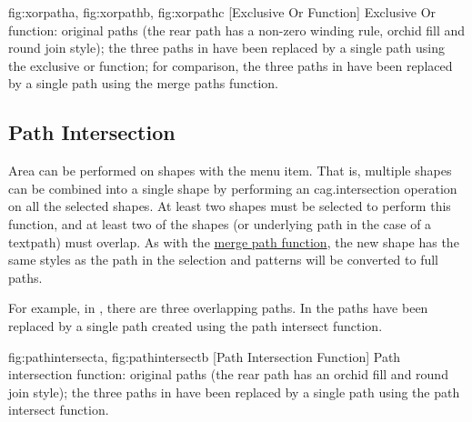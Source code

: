 {
 {fig:xorpatha}{}{},
 {fig:xorpathb}{}{},
 {fig:xorpathc}{}{}
}
[Exclusive Or Function]
{Exclusive Or function: 
 original paths (the rear path has 
a non-zero winding rule, orchid
fill  and round join style);
 the three paths in
 have been replaced by 
a single path using the exclusive or function; 
 for comparison, the three paths in
 have been replaced by 
a single path using the merge paths function.}


\subsection{Path Intersection}\label{sec:pathintersect}


Area  can be performed on \glspl{shape} with
the  menu item. That is, multiple \glspl{shape}
can be combined into a single \gls*{shape} by performing an
\gls{cag.intersection} operation on all the selected \glspl*{shape}.  At
least two \glspl*{shape} must be selected to perform this function, 
and at least two of the shapes (or underlying path
in the case of a \gls{textpath}) must overlap.
As with the \hyperref[sec:mergepaths]{merge path function}, the new
\gls*{shape} has the same styles as the 
path in the selection and \glspl{pattern} will be converted to full
\glspl{path}.

For example, in ,
there are three overlapping paths.  In
 the paths have been replaced by
a single path created using the path intersect function.

{
  {fig:pathintersecta}{}{},
  {fig:pathintersectb}{}{}
}
[Path Intersection Function]
{Path intersection function: 
 original paths (the rear path has 
an orchid fill  and round join style); 
 the three paths 
in  have been
replaced by a single path using the path intersect function.}

